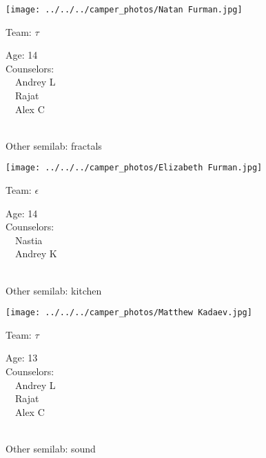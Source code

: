 \documentclass[10pt,letterpaper, landscape]{article}
\begin{document}
\renewcommand{\baselinestretch}{1} \begin{sticker}
\noindent\begin{minipage}{0.5\textwidth}\texttt{[image: ../../../camper\_photos/Natan Furman.jpg]}\end{minipage}\begin{minipage}{0.45\textwidth}
Team: {\Large $\tau$}

Age:        14\\
Counselors: \\\ \ Andrey L\\\ \ Rajat\\\ \ Alex C\\
\end{minipage} \\ \vspace{0.07in}
Other semilab: fractals
\end{sticker}
\horizontalshiftfornextsticker
\renewcommand{\baselinestretch}{1} \begin{sticker}
\noindent\begin{minipage}{0.5\textwidth}\texttt{[image: ../../../camper\_photos/Elizabeth Furman.jpg]}\end{minipage}\begin{minipage}{0.45\textwidth}
Team: {\Large $\epsilon$}

Age:        14\\
Counselors: \\\ \ Nastia\\\ \ Andrey K\\
\end{minipage} \\ \vspace{0.07in}
Other semilab: kitchen
\end{sticker}
\verticalshiftfornextsticker
\renewcommand{\baselinestretch}{1} \begin{sticker}
\noindent\begin{minipage}{0.5\textwidth}\texttt{[image: ../../../camper\_photos/Matthew Kadaev.jpg]}\end{minipage}\begin{minipage}{0.45\textwidth}
Team: {\Large $\tau$}

Age:        13\\
Counselors: \\\ \ Andrey L\\\ \ Rajat\\\ \ Alex C\\
\end{minipage} \\ \vspace{0.07in}
Other semilab: sound
\end{sticker}
\end{document}
